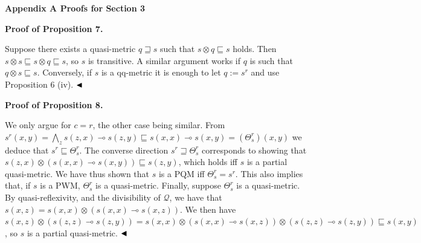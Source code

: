 \documentclass[10pt,a4paper]{amsart}
\begin{document}
 

 
\par\medskip\noindent\textbf{Appendix A Proofs for Section 3}\par
 
 
\par\medskip\noindent\textbf{Proof of Proposition 7.}\par
 
 
Suppose there exists a quasi-metric $q\sqsupseteq s$ such that $s\otimes q\sqsubseteq s$ holds. Then $s\otimes s\sqsubseteq s\otimes q\sqsubseteq s$, so $s$ is transitive. A similar argument works if $q$ is such that $q\otimes s\sqsubseteq s$. Conversely, if $s$ is a qq-metric it is enough to let $q:=s^{r}$ and use Proposition 6 (iv). $\hfill\blacktriangleleft$\par
 
 
 
 
\par\medskip\noindent\textbf{Proof of Proposition 8.}\par
 
 
We only argue for $c=r$, the other case being similar. From $s^{r}(x,y)=\bigwedge_{z}s(z,x)\multimap s(z,y)\sqsubseteq s(x,x)\multimap s(x,%
y)=(\Theta^{r}_{s})(x,y)$ we deduce that $s^{r}\sqsubseteq\Theta^{r}_{s}$. The converse direction $s^{r}\sqsupseteq\Theta^{r}_{s}$ corresponds to showing that $s(z,x)\otimes(s(x,x)\multimap s(x,y))\sqsubseteq s(z,y)$, which holds iff $s$ is a partial quasi-metric. We have thus shown that $s$ is a PQM iff $\Theta^{r}_{s}=s^{r}$. This also implies that, if $s$ is a PWM, $\Theta^{r}_{s}$ is a quasi-metric. Finally, suppose $\Theta^{r}_{s}$ is a quasi-metric. By quasi-reflexivity, and the divisibility of $\mathcal{Q}$, we have that $s(x,z)=s(x,x)\otimes(s(x,x)\multimap s(x,z))$. We then have $s(x,z)\otimes(s(z,z)\multimap s(z,y))=s(x,x)\otimes(s(x,x)\multimap s(x,z))%
\otimes(s(z,z)\multimap s(z,y))\sqsubseteq s(x,y)$, so $s$ is a partial quasi-metric. $\hfill\blacktriangleleft$\par
 
\end{document}
